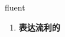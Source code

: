 
\begin{frame}
{\huge fluent}
\begin{center}
\begin{enumerate}\Large
  \item \textbf{表达流利的}
\end{enumerate}
\end{center}
\end{frame}
